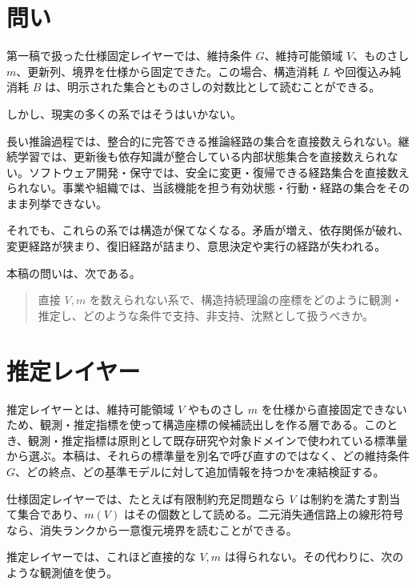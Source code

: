 \documentclass[12pt,a4paper]{article}
\begin{document}
\section{問い}\label{ux554fux3044}

第一稿で扱った仕様固定レイヤーでは、維持条件 \(G\)、維持可能領域 \(V\)、ものさし \(m\)、更新列、境界を仕様から固定できた。この場合、構造消耗 \(L\) や回復込み純消耗 \(B\) は、明示された集合とものさしの対数比として読むことができる。

しかし、現実の多くの系ではそうはいかない。

長い推論過程では、整合的に完答できる推論経路の集合を直接数えられない。継続学習では、更新後も依存知識が整合している内部状態集合を直接数えられない。ソフトウェア開発・保守では、安全に変更・復帰できる経路集合を直接数えられない。事業や組織では、当該機能を担う有効状態・行動・経路の集合をそのまま列挙できない。

それでも、これらの系では構造が保てなくなる。矛盾が増え、依存関係が破れ、変更経路が狭まり、復旧経路が詰まり、意思決定や実行の経路が失われる。

本稿の問いは、次である。

\begin{quote}
直接 \(V,m\) を数えられない系で、構造持続理論の座標をどのように観測・推定し、どのような条件で支持、非支持、沈黙として扱うべきか。
\end{quote}

\section{推定レイヤー}\label{ux63a8ux5b9aux30ecux30a4ux30e4ux30fc}

推定レイヤーとは、維持可能領域 \(V\) やものさし \(m\) を仕様から直接固定できないため、観測・推定指標を使って構造座標の候補読出しを作る層である。このとき、観測・推定指標は原則として既存研究や対象ドメインで使われている標準量から選ぶ。本稿は、それらの標準量を別名で呼び直すのではなく、どの維持条件 \(G\)、どの終点、どの基準モデルに対して追加情報を持つかを凍結検証する。

仕様固定レイヤーでは、たとえば有限制約充足問題なら \(V\) は制約を満たす割当て集合であり、\(m(V)\) はその個数として読める。二元消失通信路上の線形符号なら、消失ランクから一意復元境界を読むことができる。

推定レイヤーでは、これほど直接的な \(V,m\) は得られない。その代わりに、次のような観測値を使う。
\end{document}
